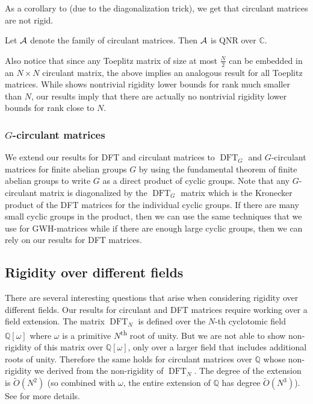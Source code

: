 \documentclass{toc}
\renewcommand\Q{{\mathbb{Q}}}
\renewcommand\C{{\mathbb{C}}}
\newcommand{\ts}{\textsuperscript}
\DeclareMathOperator{\DFT}{DFT}
\begin{document}
%
As a corollary to
%
%
%
(due to the diagonalization trick), we get that circulant matrices are not rigid.
\begin{theorem}\label{circulant_intro}
Let $\cal A$ denote the family of circulant matrices.  Then $\cal A$ is QNR over $\C$.
\end{theorem}

Also notice that since any Toeplitz matrix of size at most $\frac{N}{2}$ can be embedded in an $N \times N$ circulant matrix, the above implies an analogous result for all Toeplitz matrices.  While \cite{toeplitz} shows nontrivial rigidity lower bounds for rank much smaller than $N$, our results imply that there are actually no nontrivial rigidity lower bounds for rank close to $N$.
%

%
\subsubsection{\texorpdfstring{$G$}{G}-circulant matrices}
We extend our results for DFT and circulant matrices to
$\DFT_G$ and %
$G$-circulant matrices
for finite abelian groups $G$ %
by using the fundamental theorem of finite abelian groups to write $G$ as a direct product of cyclic groups.  Note that any $G$-circulant matrix is diagonalized by the $\DFT_G$ matrix which is %
the Kronecker product of the DFT matrices for the individual cyclic groups.  If there are many small cyclic groups in the product, then we can use the same techniques that we use for GWH-matrices while if there are enough large cyclic groups, then we can rely on our results for DFT matrices.
%

%
\subsection{Rigidity over different fields}\label{sec:differentfield}
%
There are several interesting questions that arise when considering
rigidity over different fields.
Our results for circulant and DFT matrices require working over a
field extension.
%
%
%
%
%
%
%
%
The matrix $\DFT_N$ is defined over the $N$-th cyclotomic field
$\Q[\omega]$ where $\omega$ is a primitive $N$\ts{th} root of unity.
But we are not able to show non-rigidity of this matrix over
$\Q[\omega]$, only over a larger field that includes additional
roots of unity.  Therefore the same holds for circulant matrices
over $\Q$ whose non-rigidity we derived from the non-rigidity of
$\DFT_N$.  %
The degree of the extension is
%
%
$\tilde{O}(N^2)$ (so combined with $\omega$, the entire extension of $\Q$ has degree $\tilde{O}(N^3)$). See  for more details.
%
  
\end{document}
